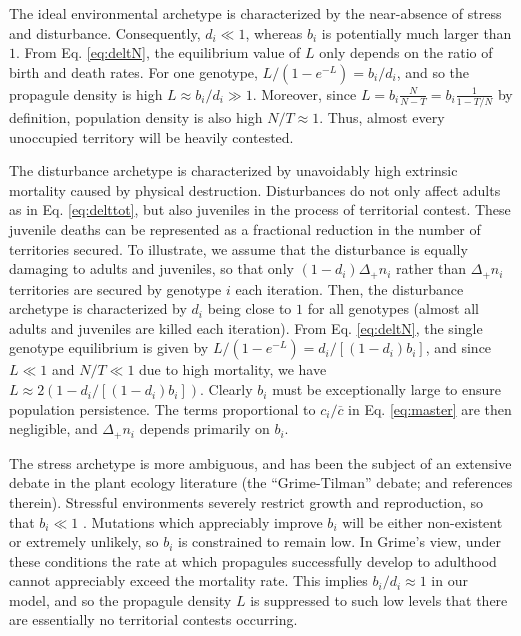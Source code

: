 \documentclass[11pt]{article}
\begin{document}
The ideal environmental archetype is characterized by the near-absence of stress and disturbance. Consequently, $d_i\ll 1$, whereas $b_i$ is potentially much larger than $1$. From Eq. \eqref{eq:deltN}, the equilibrium value of $L$ only depends on the ratio of birth and death rates. For one genotype, $L/(1-e^{-L})=b_i/d_i$, and so the propagule density is high $L\approx b_i/d_i\gg 1$. Moreover, since $L=b_i\frac{N}{N-T}=b_i\frac{1}{1-T/N}$ by definition, population density is also high $N/T\approx 1$. Thus, almost every unoccupied territory will be heavily contested. 

The disturbance archetype is characterized by unavoidably high extrinsic mortality caused by physical destruction. Disturbances do not only affect adults as in Eq. \eqref{eq:delttot}, but also juveniles in the process of territorial contest. These juvenile deaths can be represented as a fractional reduction in the number of territories secured. To illustrate, we assume that the disturbance is equally damaging to adults and juveniles, so that only $(1-d_i)\Delta_+ n_i$ rather than $\Delta_+ n_i$ territories are secured by genotype $i$ each iteration. Then, the disturbance archetype is characterized by $d_i$ being close to $1$ for all genotypes (almost all adults and juveniles are killed each iteration). From Eq. \eqref{eq:deltN}, the single genotype equilibrium is given by $L/(1-e^{-L})=d_i/[(1-d_i)b_i]$, and since $L\ll 1$ and $N/T\ll 1$ due to high mortality, we have $L\approx 2(1-d_i/[(1-d_i)b_i])$. Clearly $b_i$ must be exceptionally large to ensure population persistence. The terms proportional to $c_i/\overline{c}$ in Eq. \eqref{eq:master} are then negligible, and $\Delta_+ n_i$ depends primarily on $b_i$. 

The stress archetype is more ambiguous, and has been the subject of an extensive debate in the plant ecology literature (the ``Grime-Tilman'' debate; \citealt{aerts_1999} and references therein). Stressful environments severely restrict growth and reproduction, so that $b_i\ll 1$ \cite{grime_1974,grime_1977}. Mutations which appreciably improve $b_i$ will be either non-existent or extremely unlikely, so $b_i$ is constrained to remain low. In Grime's view, under these conditions the rate at which propagules successfully develop to adulthood cannot appreciably exceed the mortality rate. This implies $b_i/d_i\approx 1$ in our model, and so the propagule density $L$ is suppressed to such low levels that there are essentially no territorial contests occurring. 
\end{document}
